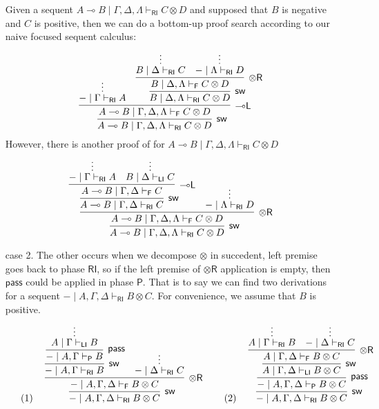 \documentclass[submission,copyright,creativecommons]{eptcs}
\theoremstyle{definition}
\newcommand{\tr}{\otimes \mathsf{R}}
\newcommand{\lleft}{{\multimap}\mathsf{L}}
\newcommand{\pass}{\mathsf{pass}}
\newcommand{\ot}{\otimes}
\newcommand{\lolli}{\multimap}
\newcommand{\RI}{\mathsf{RI}}
\newcommand{\LI}{\mathsf{LI}}
\newcommand{\Pass}{\mathsf{P}}
\newcommand{\F}{\mathsf{F}}
\begin{document}
\begin{itemize}
  Given a sequent $A \lolli B \mid \Gamma , \Delta , \Lambda \vdash_{\RI} C \ot D$ and supposed that $B$ is negative and $C$ is positive, then
  we can do a bottom-up proof search according to our naive focused sequent calculus:
  \begin{displaymath}
    \infer[\mathsf{sw}]{A \lolli B \mid \Gamma , \Delta , \Lambda \vdash_{\RI} C \ot D}{
      \infer[\lleft]{A \lolli B \mid \Gamma , \Delta , \Lambda \vdash_{\F} C \ot D}{
        \deduce{- \mid \Gamma \vdash_{\RI} A}{\vdots}
        &
        \infer[\mathsf{sw}]{B \mid \Delta , \Lambda \vdash_{\RI} C \ot D}{
          \infer[\tr]{B \mid \Delta , \Lambda \vdash_{\F} C \ot D}{
            \deduce{B \mid \Delta \vdash_{\RI} C}{\vdots}
            &
            \deduce{- \mid \Lambda \vdash_{\RI} D}{\vdots}
          }
        }
      }
    }
  \end{displaymath}
  However, there is another proof of for $A \lolli B \mid \Gamma , \Delta , \Lambda \vdash_{\RI} C \ot D$
  \begin{displaymath}
    \infer[\mathsf{sw}]{A \lolli B \mid \Gamma , \Delta , \Lambda \vdash_{\RI} C \ot D}{
      \infer[\tr]{A \lolli B \mid \Gamma , \Delta , \Lambda \vdash_{\F} C \ot D}{
        \infer[\mathsf{sw}]{A \lolli B \mid \Gamma , \Delta \vdash_{\RI} C}{
          \infer[\lleft]{A \lolli B \mid \Gamma , \Delta \vdash_{\F} C}{
            \deduce{- \mid \Gamma \vdash_{\RI} A}{\vdots}
            &
            \deduce{B \mid \Delta \vdash_{\LI} C}{\vdots}
          }
        }
        &
        \deduce{- \mid \Lambda \vdash_{\RI} D}{\vdots}
      }
    }
  \end{displaymath}
  \item[case 2.] The other occurs when we decompose $\ot$ in succedent, left premise goes back to phase $\RI$, so if the left premise of $\tr$ application is empty, then $\pass$ could be applied in phase $\Pass$.
  That is to say we can find two derivations for a sequent $- \mid A , \Gamma , \Delta \vdash_{\RI} B \ot C$.
  For convenience, we assume that $B$ is positive.
  \begin{displaymath}
  \vcenter{
  \text{(1)}
  \quad
    \infer[\mathsf{sw}]{- \mid A , \Gamma , \Delta \vdash_{\RI} B \ot C}{
      \infer[\tr]{- \mid A , \Gamma , \Delta \vdash_{\F} B \ot C}{
        \infer[\mathsf{sw}]{- \mid A , \Gamma \vdash_{\RI} B}{
          \infer[\pass]{- \mid A , \Gamma \vdash_{\Pass} B}{
            \deduce{A \mid \Gamma \vdash_{\LI} B}{\vdots}
          }
        }
        &
        \deduce{- \mid \Delta \vdash_{\RI} C}{\vdots}
      }
    }
    \qquad
    \text{(2)}
    \quad
    \infer[\mathsf{sw}]{- \mid A , \Gamma , \Delta \vdash_{\RI} B \ot C}{
      \infer[\pass]{- \mid A , \Gamma , \Delta \vdash_{\Pass} B \ot C}{
        \infer[\mathsf{sw}]{A \mid \Gamma , \Delta \vdash_{\LI} B \ot C}{
          \infer[\tr]{A \mid \Gamma , \Delta \vdash_{\F} B \ot C}{
            \deduce{A \mid \Gamma \vdash_{\RI} B}{\vdots}
            &
            \deduce{- \mid \Delta \vdash_{\RI} C}{\vdots}
          }
        }
      }
    }
  }
  \end{displaymath}

\end{itemize}
\end{document}
